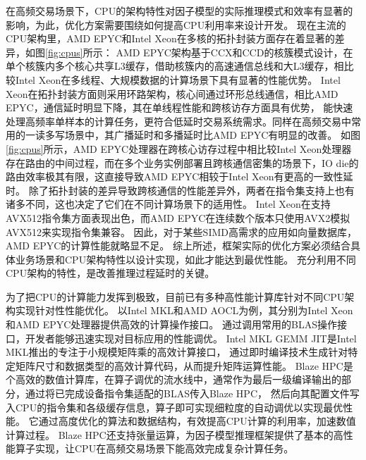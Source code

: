 在高频交易场景下，CPU的架构特性对因子模型的实际推理模式和效率有显著的影响，为此，优化方案需要围绕如何提高CPU利用率来设计开发。
现在主流的CPU架构里，AMD EPYC和Intel Xeon在多核的拓扑封装方面存在着显著的差异，如图\ref{fig:cpus}所示：
AMD EPYC架构基于CCX和CCD的核簇模式设计，在单个核簇内多个核心共享L3缓存，借助核簇内的高速通信总线和大L3缓存，相比较Intel Xeon在多线程、大规模数据的计算场景下具有显著的性能优势。
Intel Xeon在拓扑封装方面则采用环路架构，核心间通过环形总线通信，相比AMD EPYC，通信延时明显下降，其在单线程性能和跨核访存方面具有优势，
能快速处理高频率单样本的计算任务，更符合低延时交易系统需求。同样在高频交易中常用的一读多写场景中，其广播延时和多播延时比AMD EPYC有明显的改善。
如图\ref{fig:cpus}所示，AMD EPYC处理器在跨核心访存过程中相比较Intel Xeon处理器存在路由的中间过程，而在多个业务实例部署且跨核通信密集的场景下，IO die的路由效率极其有限，这直接导致AMD EPYC相较于Intel Xeon有更高的一致性延时。
除了拓扑封装的差异导致跨核通信的性能差异外，两者在指令集支持上也有诸多不同，这也决定了它们在不同计算场景下的适用性。
Intel Xeon在支持AVX512指令集方面表现出色，而AMD EPYC在连续数个版本只使用AVX2模拟AVX512来实现指令集兼容。
因此，对于某些SIMD高需求的应用如向量数据库，AMD EPYC的计算性能就略显不足。
综上所述，框架实际的优化方案必须结合具体业务场景和CPU架构特性以设计实现，如此才能达到最优性能。
充分利用不同CPU架构的特性，是改善推理过程延时的关键。

为了把CPU的计算能力发挥到极致，目前已有多种高性能计算库针对不同CPU架构实现针对性性能优化。
以Intel MKL和AMD AOCL为例，其分别为Intel Xeon和AMD EPYC处理器提供高效的计算操作接口。
通过调用常用的BLAS操作接口，开发者能够迅速实现对目标应用的性能调优。
Intel MKL GEMM JIT是Intel MKL推出的专注于小规模矩阵乘的高效计算接口，
通过即时编译技术生成针对特定矩阵尺寸和数据类型的高效计算代码，从而提升矩阵运算性能。
Blaze HPC是个高效的数值计算库，在算子调优的流水线中，通常作为最后一级编译输出的部分，通过将已完成设备指令集适配的BLAS传入Blaze HPC，
然后向其配置文件写入CPU的指令集和各级缓存信息，算子即可实现细粒度的自动调优以实现最优性能。
它通过高度优化的算法和数据结构，有效提高CPU计算的利用率，加速数值计算过程。
Blaze HPC还支持张量运算，为因子模型推理框架提供了基本的高性能算子实现，让CPU在高频交易场景下能高效完成复杂计算任务。